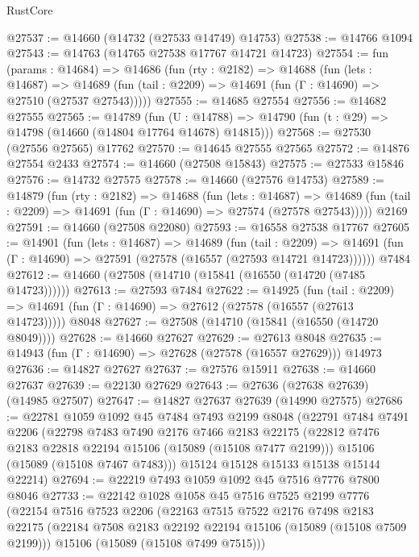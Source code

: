 \begin{lexlean}{RustCore}
\begin{coremodule}
@27537 := @14660 (@14732 (@27533 @14749) @14753)
@27538 := @14766 @1094
@27543 := @14763 (@14765 @27538 @17767 @14721 @14723)
@27554 := fun (params : @14684) =>
  @14686
    (fun (rty : @2182) =>
    @14688
      (fun (lets : @14687) =>
      @14689 (fun (tail : @2209) => @14691 (fun (Γ : @14690) => @27510 (@27537 @27543)))))
@27555 := @14685 @27554
@27556 := @14682 @27555
@27565 := @14789
    (fun (U : @14788) => @14790 (fun (t : @29) => @14798 (@14660 (@14804 @17764 @14678) @14815)))
@27568 := @27530 (@27556 @27565) @17762
@27570 := @14645 @27555 @27565
@27572 := @14876 @27554 @2433
@27574 := @14660 (@27508 @15843)
@27575 := @27533 @15846
@27576 := @14732 @27575
@27578 := @14660 (@27576 @14753)
@27589 := @14879
    (fun (rty : @2182) =>
    @14688
      (fun (lets : @14687) =>
      @14689 (fun (tail : @2209) => @14691 (fun (Γ : @14690) => @27574 (@27578 @27543)))))
    @2169
@27591 := @14660 (@27508 @22080)
@27593 := @16558 @27538 @17767
@27605 := @14901
    (fun (lets : @14687) =>
    @14689
      (fun (tail : @2209) =>
      @14691 (fun (Γ : @14690) => @27591 (@27578 (@16557 (@27593 @14721 @14723))))))
    @7484
@27612 := @14660 (@27508 (@14710 (@15841 (@16550 (@14720 (@7485 @14723))))))
@27613 := @27593 @7484
@27622 := @14925
    (fun (tail : @2209) => @14691 (fun (Γ : @14690) => @27612 (@27578 (@16557 (@27613 @14723)))))
    @8048
@27627 := @27508 (@14710 (@15841 (@16550 (@14720 @8049))))
@27628 := @14660 @27627
@27629 := @27613 @8048
@27635 := @14943 (fun (Γ : @14690) => @27628 (@27578 (@16557 @27629))) @14973
@27636 := @14827 @27627
@27637 := @27576 @15911
@27638 := @14660 @27637
@27639 := @22130 @27629
@27643 := @27636 (@27638 @27639) (@14985 @27507)
@27647 := @14827 @27637 @27639 (@14990 @27575)
@27686 := @22781
    @1059
    @1092
    @45
    @7484
    @7493
    @2199
    @8048
    (@22791
      @7484
      @7491
      @2206
      (@22798
        @7483
        @7490
        @2176
        @7466
        @2183
        @22175
        (@22812 @7476 @2183 @22818 @22194 @15106 (@15089 (@15108 @7477 @2199)))
        @15106
        (@15089 (@15108 @7467 @7483)))
      @15124
      @15128
      @15133
      @15138
      @15144
      @22214)
@27694 := @22219 @7493 @1059 @1092 @45 @7516 @7776 @7800 @8046
@27733 := @22142
    @1028
    @1058
    @45
    @7516
    @7525
    @2199
    @7776
    (@22154
      @7516
      @7523
      @2206
      (@22163
        @7515
        @7522
        @2176
        @7498
        @2183
        @22175
        (@22184 @7508 @2183 @22192 @22194 @15106 (@15089 (@15108 @7509 @2199)))
        @15106
        (@15089 (@15108 @7499 @7515)))

\end{coremodule}
\end{lexlean}
